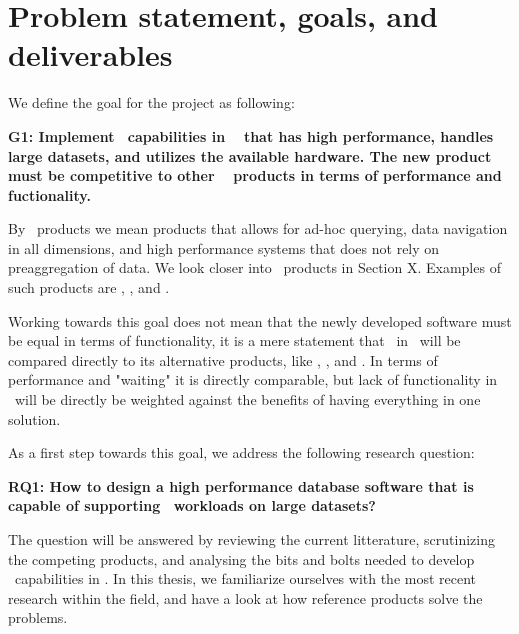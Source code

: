 \section{Problem statement, goals, and deliverables}
\label{sec:problem-statement-and-goals}

We define the goal for the project as following: 

\textbf{G1: Implement \bd~capabilities in \genusSoftware~ that has high performance, handles large datasets, and utilizes the available hardware. The new product must be competitive to other \bd~ products in terms of performance and fuctionality.}

By \bd~products we mean products that allows for ad-hoc querying, data navigation in all dimensions, and high performance systems that does not rely on preaggregation of data. We look closer into \bd~products in Section X. Examples of such products are \qlikview, \tableau, and \powerpivot.

Working towards this goal does not mean that the newly developed software must be equal in terms of functionality, it is a mere statement that \bi~in \genusSoftware~will be compared directly to its alternative products, like \qlikview, \tableau, and \powerpivot. In terms of performance and "waiting" it is directly comparable, but lack of functionality in \genusSoftware~will be directly be weighted against the benefits of having everything in one solution.

As a first step towards this goal, we address the following research question:

\textbf{RQ1: How to design a high performance database software that is capable of supporting \bd~workloads on large datasets?} 

The question will be answered by reviewing the current litterature, scrutinizing the competing products, and analysing the bits and bolts needed to develop \bd~capabilities in \genusSoftware. In this thesis, we familiarize ourselves with the most recent research within the field, and have a look at how reference products solve the problems. 

